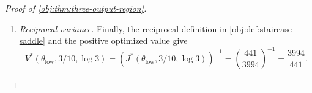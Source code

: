 \documentclass[11pt]{article}
\begin{document}
\begin{proof}[Proof of \cref{obj:thm:three-output-region}]
\begin{enumerate}
The normalization equations at input coordinates \(0,1,3\) now reduce to
\[
\begin{aligned}
3\beta_{S_1}+\beta_{S_6}+\beta_{S_8}&=1,\\
\beta_{S_1}+3\beta_{S_6}+\beta_{S_8}&=1,\\
\beta_{S_1}+\beta_{S_6}+3\beta_{S_8}&=1.
\end{aligned}
\]
Their differences give
\[
2(\beta_{S_1}-\beta_{S_6})=0,
\qquad
2(\beta_{S_6}-\beta_{S_8})=0,
\]
and substitution gives
\[
\beta_{S_1}=\beta_{S_6}=\beta_{S_8}=\frac15.
\]
For \(S\in\mathcal K\), these weights equal \(\alpha_S\); for \(S\notin\mathcal K\), both weights are zero. Therefore \(\beta=\alpha\).

\item \textit{Reciprocal variance.}
Finally, the reciprocal definition in \cref{obj:def:staircase-saddle} and the positive optimized value give
\[
V^*(\theta_{\mathrm{low}},3/10,\log3)
=
\left(J^*(\theta_{\mathrm{low}},3/10,\log3)\right)^{-1}
=
\left(\frac{441}{3994}\right)^{-1}
=
\frac{3994}{441}.
\]
\end{enumerate}
\end{proof}
\end{document}
